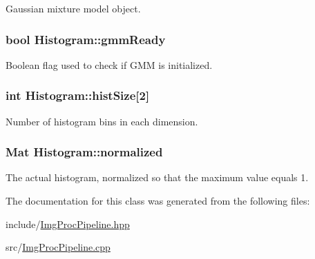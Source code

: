 \-Gaussian mixture model object. 

\hypertarget{classHistogram_a5e10a5415fa15ef0f47559eafed3e5e3}{
\subsubsection[{gmm\-Ready}]{\setlength{\rightskip}{0pt plus 5cm}bool {\bf \-Histogram\-::gmm\-Ready}}}\label{classHistogram_a5e10a5415fa15ef0f47559eafed3e5e3}


\-Boolean flag used to check if \-G\-M\-M is initialized. 

\hypertarget{classHistogram_aaedf097871b566db37a9c3a8c4370367}{
\subsubsection[{hist\-Size}]{\setlength{\rightskip}{0pt plus 5cm}int {\bf \-Histogram\-::hist\-Size}\mbox{[}2\mbox{]}}}\label{classHistogram_aaedf097871b566db37a9c3a8c4370367}


\-Number of histogram bins in each dimension. 

\hypertarget{classHistogram_a09a02c61bdced17b5fe0fe2351fa8ba9}{
\subsubsection[{normalized}]{\setlength{\rightskip}{0pt plus 5cm}\-Mat {\bf \-Histogram\-::normalized}}}\label{classHistogram_a09a02c61bdced17b5fe0fe2351fa8ba9}


\-The actual histogram, normalized so that the maximum value equals 1. 



\-The documentation for this class was generated from the following files\-:\begin{DoxyCompactItemize}
\item 
include/\hyperlink{ImgProcPipeline_8hpp}{\-Img\-Proc\-Pipeline.\-hpp}\item 
src/\hyperlink{ImgProcPipeline_8cpp}{\-Img\-Proc\-Pipeline.\-cpp}\end{DoxyCompactItemize}
